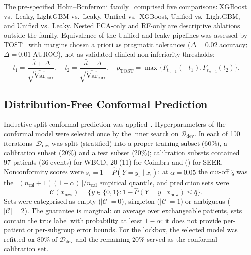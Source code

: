 \documentclass[11pt,a4paper]{article}
\begin{document}
The pre-specified Holm--Bonferroni family~\cite{holm1979} comprised five comparisons: XGBoost vs.\ Leaky, LightGBM vs.\ Leaky, Unified vs.\ XGBoost, Unified vs.\ LightGBM, and Unified vs.\ Leaky. Nested PCA-only and RF-only are descriptive ablations outside the family. Equivalence of the Unified and leaky pipelines was assessed by TOST~\cite{schuirmann1987,walker2011} with margins chosen a priori as pragmatic tolerances ($\Delta=0.02$ accuracy; $\Delta=0.01$ AUROC), not as validated clinical non-inferiority thresholds:
\begin{equation}
t_1=\frac{\bar{d}+\Delta}{\sqrt{\widehat{\operatorname{Var}}_{\text{corr}}}},\quad t_2=\frac{\bar{d}-\Delta}{\sqrt{\widehat{\operatorname{Var}}_{\text{corr}}}},\quad p_{\text{TOST}}=\max\{F_{t_{n-1}}(-t_1),F_{t_{n-1}}(t_2)\}.
\end{equation}

\subsection{Distribution-Free Conformal Prediction}\label{sec:distribution-free-conformal-pr}
Inductive split conformal prediction was applied~\cite{angelopoulos2021,vovk2005}. Hyperparameters of the conformal model were selected once by the inner search on $\mathcal{D}_{\text{dev}}$. In each of 100 iterations, $\mathcal{D}_{\text{dev}}$ was split (stratified) into a proper training subset (60\%), a calibration subset (20\%) and a test subset (20\%); calibration subsets contained 97 patients (36 events) for WBCD, 20 (11) for Coimbra and \seerNcal{} (\seerNcalEv) for SEER. Nonconformity scores were $s_i=1-\hat{P}(Y=y_i\mid x_i)$; at $\alpha=0.05$ the cut-off $\hat{q}$ was the $\lceil(n_{\text{cal}}+1)(1-\alpha)\rceil/n_{\text{cal}}$ empirical quantile, and prediction sets were
\begin{equation}
\mathcal{C}(x_{\text{new}})=\{y\in\{0,1\}:1-\hat{P}(Y=y\mid x_{\text{new}})\le\hat{q}\}.
\end{equation}
Sets were categorised as empty ($|\mathcal{C}|=0$), singleton ($|\mathcal{C}|=1$) or ambiguous ($|\mathcal{C}|=2$). The guarantee is marginal: on average over exchangeable patients, sets contain the true label with probability at least $1-\alpha$; it does not provide per-patient or per-subgroup error bounds. For the lockbox, the selected model was refitted on 80\% of $\mathcal{D}_{\text{dev}}$ and the remaining 20\% served as the conformal calibration set.
\end{document}
